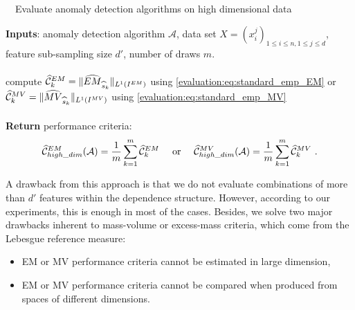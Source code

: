 \begin{algorithm}[!tbh]
\caption{~~Evaluate anomaly detection algorithms on high dimensional data}
\label{evaluation:algo:EMMV}
\begin{algorithmic}
  \STATE \textbf{Inputs}: anomaly detection algorithm $\mathcal{A}$, data set $X = (x^j_i)_{1 \le i \le n, 1 \le j \le d }$, feature sub-sampling size $d'$, number of draws $m$.\\~\\

    \STATE compute $\widehat{\mathcal{C}}_k^{EM} = \| \widehat{EM}_{\widehat s_k} \|_{L^1(I^{EM})}$ using \eqref{evaluation:eq:standard_emp_EM} or $\widehat{\mathcal{C}}_k^{MV} = \| \widehat{MV}_{\widehat s_k} \|_{L^1(I^{MV})}$ using \eqref{evaluation:eq:standard_emp_MV}
  \ENDFOR \\~\\

  \STATE \textbf{Return} performance criteria: $$\widehat{\mathcal{C}}^{EM}_{high\_dim} (\mathcal{A})= \frac{1}{m} \sum_{k=1}^m\widehat {\mathcal{C}}_k^{EM} \text{~~~~or~~~~} \widehat{\mathcal{C}}^{MV}_{high\_dim}(\mathcal{A}) = \frac{1}{m} \sum_{k=1}^m\widehat {\mathcal{C}}_k^{MV}~.$$
\end{algorithmic}
\end{algorithm}
%

A drawback from this approach is that we do not evaluate combinations of more than $d'$ features within the dependence structure. However, according to our experiments, this is enough in most of the cases. Besides, we solve two major drawbacks inherent to mass-volume or excess-mass criteria, %
which come from the Lebesgue reference measure:
\begin{itemize}
\item  EM or MV performance criteria cannot be estimated in large dimension,
\item  EM or MV performance criteria cannot be compared when produced from spaces of different dimensions. 
\end{itemize}

